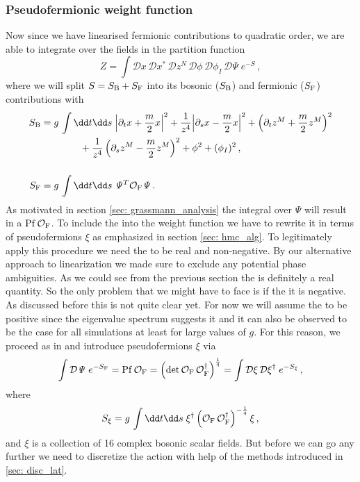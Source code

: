 \subsubsection{Pseudofermionic weight function}
Now since we have linearised fermionic contributions to quadratic order, we are able to integrate over the  fields in the partition function
%
%
\begin{equation}
Z = \int \mathcal{D}x\,\mathcal{D}x^{*}\,\mathcal{D}z^{N}\,\mathcal{D}\phi\,\mathcal{D}\phi_{I}\,\mathcal{D}\mathit{\Psi}\; e^{-S}\,,
\end{equation}
%
%
where we will split $S = S_{\rm B} + S_{\rm F}$ into its bosonic ($S_{\rm B}$) and fermionic ($S_{\rm F}$) contributions with
%
%
\begin{align}
S_{\rm B} &= g\,\int \dd t\dd s\; {\left\vert \partial_t {x} + {\frac{m}{2}}{x} \right\vert}^2 + \frac{1}{{ z}^4}{\left\vert \partial_s {x} -\frac{m}{2}{x} \right\vert}^2 + \left(\partial_t {z}^M + \frac{m}{2}{z}^M \right)^2 \notag \\ 
&\qquad\qquad+ \frac{1}{{ z}^4} \left(\partial_s {z}^M -\frac{m}{2}{z}^M\right)^2 + \phi^2 + (\phi_{I})^{2}\,, \label{eq: bos_act} \\[0.5cm]
S_{\rm F} &=  g\,\int \dd t\dd s\; \mathit{\Psi}^T \mathcal{O}_{\rm F} \mathit{\Psi}\,. \notag 
\end{align}
%
%
As motivated in section \ref{sec: grassmann_analysis} the  integral over $\mathit{\Psi}$ will result in a  ${\rm Pf}\,\mathcal{O}_{\rm F}$. To include the  into the weight function we have to rewrite it in terms of pseudofermions $\xi$ as emphasized in section \ref{sec: hmc_alg}. To legitimately apply this procedure we need the  to be real and non-negative. By our alternative approach to linearization we made sure to exclude any potential phase ambiguities. As we could see from the previous section the  is definitely a real quantity. So the only problem that we might have to face is if the it is negative. As discussed before this is not quite clear yet. For now we will assume the  to be positive since the eigenvalue spectrum suggests it and it can also be observed to be the case for all simulations at least for large values of $g$. For this reason, we proceed as in \cite{Roiban} and introduce pseudofermions $\xi$ via
%
%
\begin{equation}
\int \mathcal{D}\mathit{\Psi}\; e^{-S_{\rm F}} = {\rm Pf}\,\mathcal{O}_{\rm F} =\left( \det \mathcal{O}_{\rm F}\,\mathcal{O}_{\rm F}^{\dagger} \right)^{\frac{1}{4}} = \int \mathcal{D}\xi\,\mathcal{D}\xi^{\dagger}\; e^{-S_{\xi}}\,,
\end{equation}
%
%
where
%
%
\begin{equation}
S_{\xi} = g\,\int \dd t\dd s \; \xi^{\dagger} \left(\mathcal{O}_{\rm F}\,\mathcal{O}_{\rm F}^{\dagger} \right)^{-\frac{1}{4}} \xi \,,
\end{equation}
and $\xi$ is a collection of 16 complex bosonic scalar fields. But before we can go any further we need to discretize the action with help of the methods introduced in \autoref{sec: disc_lat}. 
%
%
%
%
%
%
%
%
%
%
